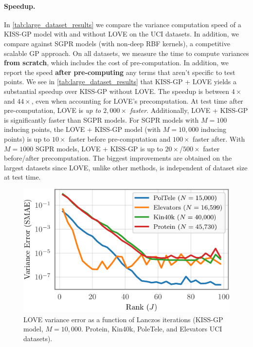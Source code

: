 \paragraph{Speedup.}
In \cref{tab:large_dataset_results} we compare the variance computation speed of a KISS-GP model with and without LOVE{} on the UCI datasets.
In addition, we compare against SGPR models (with non-deep RBF kernels), a competitive scalable GP approach.
On all datasets, we measure the time to compute variances {\bf from scratch}, which includes the cost of pre-computation.
In addition, we report the speed {\bf after pre-computing} any terms that aren't specific to test points.
We see in \cref{tab:large_dataset_results} that KISS-GP + LOVE{} yields a substantial speedup over KISS-GP without LOVE{}.
The speedup is between $4\times$ and $44\times$, even when accounting for LOVE{}'s precomputation.
At test time after pre-computation, LOVE{} is \emph{up to $2,\!000\times$ faster}.
Additionally, LOVE + KISS-GP{} is significantly faster than SGPR models.
For SGPR models with $M=100$ inducing points, the LOVE + KISS-GP{} model (with $M=10,\!000$ inducing points) is up to $10\times$ faster before pre-computation and $100\times$ faster after.
With $M=1000$ SGPR models, LOVE + KISS-GP{} is up to $20\times$/$500\times$ faster before/after precomputation.
The biggest improvements are obtained on the largest datasets since LOVE{}, unlike other methods, is independent of dataset size at test time.

\begin{figure}[t!]
  \centering
  \includegraphics[width=0.65\columnwidth]{figures/lanczos_accuracy.pdf}
  \vspace{-2ex}
  \caption[LOVE variance error as a function of Lanczos iterations.]{
    LOVE variance error as a function of Lanczos iterations
    (KISS-GP model, $M=10,\!000$. Protein, Kin40k, PoleTele, and Elevators UCI datasets).
    \label{fig:lanczos_accuracy}
  }
  \vspace{-1ex}
\end{figure}

